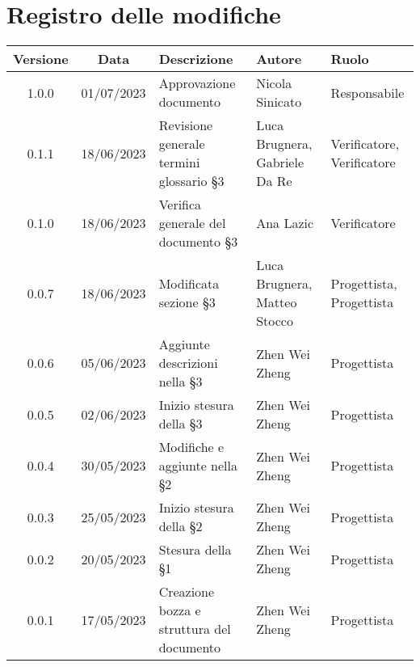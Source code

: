 \section*{Registro delle modifiche}
\begin{center}
\setlength\extrarowheight{5pt}
\renewcommand\tabularxcolumn[1]{>{\Centering}m{#1}}
\begin{tabularx}{\textwidth}{| c | c | X | X | X |} 
	\hline
	\rowcolor{white}
	\textbf{Versione} & \textbf{Data} & \textbf{Descrizione} & \textbf{Autore} & \textbf{Ruolo}\\
	\hline
	1.0.0 & 01/07/2023 & Approvazione documento & Nicola Sinicato & Responsabile \\
	\hline
	0.1.1 & 18/06/2023 & Revisione generale termini glossario §3 & Luca Brugnera, Gabriele Da Re & Verificatore, Verificatore\\
	\hline
	0.1.0 & 18/06/2023 & Verifica generale del documento §3 & Ana Lazic & Verificatore\\
	\hline
	0.0.7 & 18/06/2023 & Modificata sezione §3 & Luca Brugnera, Matteo Stocco & Progettista, Progettista\\
	\hline
	0.0.6 & 05/06/2023 & Aggiunte descrizioni nella §3 & Zhen Wei Zheng & Progettista\\
	\hline
	0.0.5 & 02/06/2023 & Inizio stesura della §3 & Zhen Wei Zheng & Progettista\\
	\hline
	0.0.4 & 30/05/2023 & Modifiche e aggiunte nella §2 & Zhen Wei Zheng & Progettista\\
	\hline
	0.0.3 & 25/05/2023 & Inizio stesura della §2 & Zhen Wei Zheng & Progettista\\
	\hline
	0.0.2 & 20/05/2023 & Stesura della §1 & Zhen Wei Zheng & Progettista\\
	\hline
	0.0.1 & 17/05/2023 & Creazione bozza e struttura del documento & Zhen Wei Zheng & Progettista\\
	\hline
	\end{tabularx}
\end{center}
